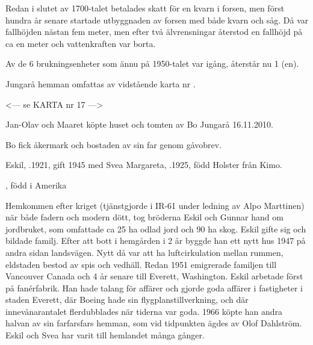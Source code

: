 Redan i slutet av 1700-talet betalades skatt för en kvarn i forsen, men först hundra år senare startade utbyggnaden av forsen med både kvarn och såg. Då var fallhöjden nästan fem meter, men efter två älvrensningar återstod en fallhöjd på ca en meter och vattenkraften var borta.

Av de 6 brukningsenheter som ännu på 1950-talet var igång, återstår nu 1 (en).


Jungarå hemman omfattas av vidstående karta nr .


<--- se KARTA nr 17 --->








Jan-Olav och Maaret köpte huset och tomten av Bo Jungarå 16.11.2010.\jhvspace{}


Bo fick åkermark och bostaden av sin far genom gåvobrev.\jhvspace{}


Eskil, .1921, gift 1945 med Svea Margareta, .1925, född Holster från Kimo.
\begin{jhchildren}
  \item {}
  \item {}, född i Amerika
\end{jhchildren}

Hemkommen efter kriget (tjänstgjorde i IR-61 under ledning av Alpo 	Marttinen) när både fadern och modern dött, tog bröderna Eskil och Gunnar hand om jordbruket, som omfattade ca 25 ha odlad jord och 90 ha skog. Eskil gifte sig och bildade familj. Efter att bott i hemgården i 2 år byggde han ett nytt hus 1947 på andra sidan landsvägen. Nytt då var att ha luftcirkulation mellan rummen, eldstaden bestod av spis och vedhäll. Redan 1951 emigrerade familjen till Vancouver 	Canada och 4 år senare till Everett, Washington. Eskil arbetade först på fanérfabrik. Han hade talang för affärer och gjorde goda affärer i fastigheter i staden Everett, där Boeing hade sin flygplanstillverkning, och där innevånarantalet flerdubblades när tiderna var goda. 1966 köpte han andra halvan av sin farfarsfars hemman, som vid tidpunkten ägdes av Olof Dahlström. Eskil och Svea har varit till hemlandet många gånger.

